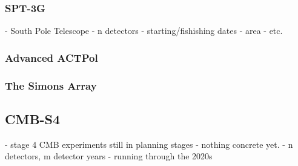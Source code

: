 \subsubsection{SPT-3G}
	- South Pole Telescope
	- n detectors
	- starting/fishishing dates
	- area
	- etc.
\subsubsection{Advanced ACTPol}
\subsubsection{The Simons Array}
\subsection{CMB-S4}
	- stage 4 CMB experiments still in planning stages - nothing concrete yet.
	- n detectors, m detector years
	- running through the 2020s